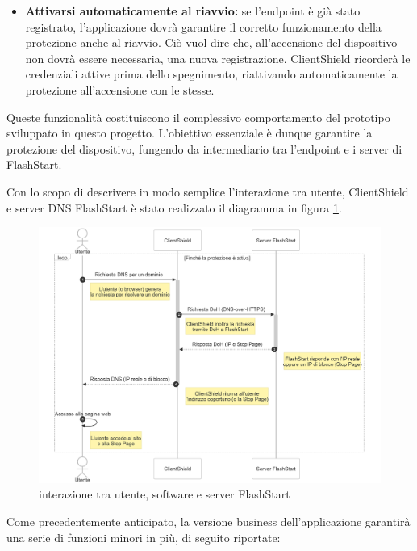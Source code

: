 \documentclass[12pt,a4paper,openright,twoside]{book}
\begin{document}
\begin{itemize}
	\item \textbf{Attivarsi automaticamente al riavvio:}
	se l'endpoint è già stato registrato, l'applicazione dovrà garantire il corretto funzionamento della protezione anche al riavvio.
	Ciò vuol dire che, all'accensione del dispositivo non dovrà essere necessaria, una nuova registrazione.
	ClientShield ricorderà le credenziali attive prima dello spegnimento, riattivando automaticamente la protezione all'accensione con le stesse.
	
\end{itemize}
Queste funzionalità costituiscono il complessivo comportamento del prototipo sviluppato in questo progetto.
L'obiettivo essenziale è dunque garantire la protezione del dispositivo, fungendo da intermediario tra l'endpoint e i server di FlashStart.

Con lo scopo di descrivere in modo semplice l'interazione tra utente, ClientShield e server \gls{DNS} FlashStart è stato realizzato il diagramma in figura \ref{fig:interazione-utente-software-server}.

\begin{figure}[H]
	\centering
	\includegraphics[width=1.0\textwidth]{figures/schema-utente-software-server.png}
	\caption{interazione tra utente, software e server FlashStart}
	\label{fig:interazione-utente-software-server}
\end{figure}
Come precedentemente anticipato, la versione business dell'applicazione garantirà una serie di funzioni minori in più, di seguito riportate:
\end{document}
